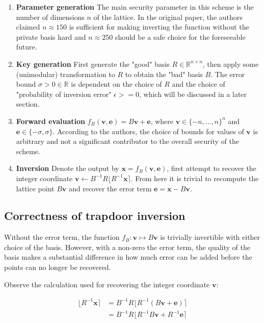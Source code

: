 \begin{enumerate}
    \item \textbf{Parameter generation} The main security parameter in this scheme is the number of dimensions $n$ of the lattice. In the original paper, the authors claimed $n \approx 150$ is sufficient for making inverting the function without the private basis hard and $n \approx 250$ should be a safe choice for the foreseeable future.
    \item \textbf{Key generation} First generate the "good" basis $R \in \mathbb{R}^{n \times n}$, then apply some (unimodular) transformation to $R$ to obtain the "bad" basis $B$. The error bound $\sigma > 0 \in \mathbb{R}$ is dependent on the choice of $R$ and the choice of "probability of inversion error" $\epsilon >= 0$, which will be discussed in a later section.
    \item \textbf{Forward evaluation} $f_{B}(\mathbf{v}, \mathbf{e}) = B\mathbf{v} + \mathbf{e}$, where $\mathbf{v} \in \{-n, \ldots, n\}^n$ and $\mathbf{e} \in \{-\sigma, \sigma\}$. According to the authors, the choice of bounds for values of $\mathbf{v}$ is arbitrary and not a significant contributor to the overall security of the scheme.
    \item \textbf{Inversion} Denote the output by $\mathbf{x} = f_{B}(\mathbf{v}, \mathbf{e})$, first attempt to recover the integer coordinate $\mathbf{v} \leftarrow B^{-1}R\lfloor R^{-1}\mathbf{x} \rceil$. From here it is trivial to recompute the lattice point $B\mathbf{v}$ and recover the error term $\mathbf{e} = \mathbf{x} - B\mathbf{v}$.
\end{enumerate}

\subsection{Correctness of trapdoor inversion}
Without the error term, the function $f_B: \mathbf{v} \mapsto B\mathbf{v}$ is trivially invertible with either choice of the basis. However, with a non-zero the error term, the quality of the basis makes a substantial difference in how much error can be added before the points can no longer be recovered.

Observe the calculation used for recovering the integer coordinate $\mathbf{v}$:

$$
\begin{aligned}
\lfloor R^{-1}\mathbf{x} \rceil &= B^{-1}R\lfloor R^{-1}(B\mathbf{v} + \mathbf{e})\rceil \\
&= B^{-1}R\lfloor R^{-1}B\mathbf{v} + R^{-1}\mathbf{e}\rceil
\end{aligned}
$$

